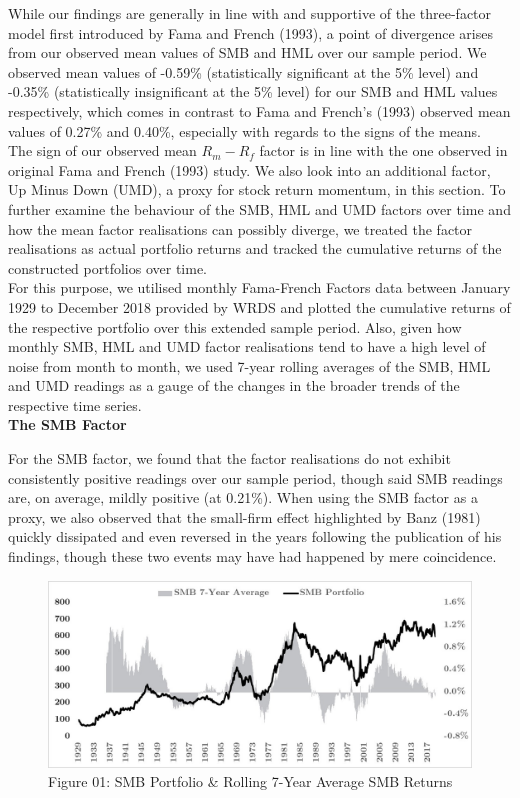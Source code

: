 \documentclass[12pt]{article}
\begin{document}
\noindent While our findings are generally in line with and supportive of the three-factor model first introduced by Fama and French (1993), a point of divergence arises from our observed mean values of SMB and HML over our sample period. We observed mean values of -0.59\% (statistically significant at the 5\% level) and -0.35\% (statistically insignificant at the 5\% level) for our SMB and HML values respectively, which comes in contrast to Fama and French's (1993) observed mean values of 0.27\% and 0.40\%, especially with regards to the signs of the means. \\

\noindent The sign of our observed mean $R_m - R_f$ factor is in line with the one observed in original Fama and French (1993) study. We also look into an additional factor, Up Minus Down (UMD), a proxy for stock return momentum, in this section. To further examine the behaviour of the SMB, HML and UMD factors over time and how the mean factor realisations can possibly diverge, we treated the factor realisations as actual portfolio returns and tracked the cumulative returns of the constructed portfolios over time.\\

\noindent For this purpose, we utilised monthly Fama-French Factors data between January 1929 to December 2018 provided by WRDS and plotted the cumulative returns of the respective portfolio over this extended sample period. Also, given how monthly SMB, HML and UMD factor realisations tend to have a high level of noise from month to month, we used 7-year rolling averages of the SMB, HML and UMD readings as a gauge of the changes in the broader trends of the respective time series.\\

\noindent \textbf{The SMB Factor}

\noindent For the SMB factor, we found that the factor realisations do not exhibit consistently positive readings over our sample period, though said SMB readings are, on average, mildly positive (at 0.21\%). When using the SMB factor as a proxy, we also observed that the small-firm effect highlighted by Banz (1981) quickly dissipated and even reversed in the years following the publication of his findings, though these two events may have had happened by mere coincidence.\\

\begin{figure}[h]
	\centering
	\includegraphics[width=0.83\linewidth,trim=4 4 4 4,clip]{SMB01}
	\caption*{Figure 01: SMB Portfolio \& Rolling 7-Year Average SMB Returns}
	\label{fig:label}
\end{figure}
\end{document}

